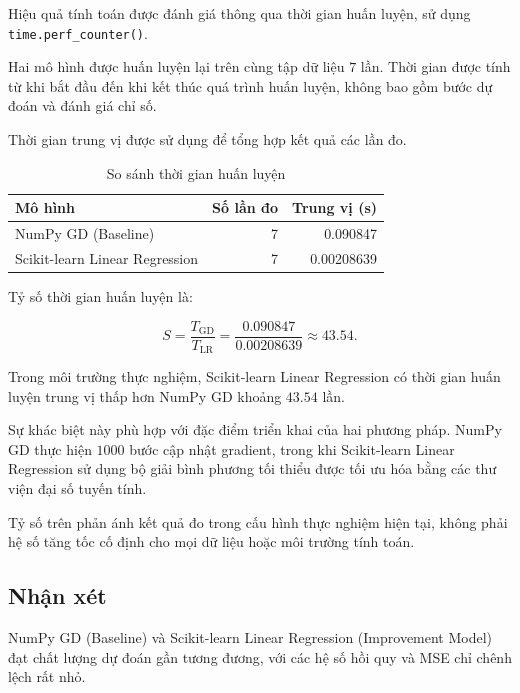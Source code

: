 Hiệu quả tính toán được đánh giá
thông qua thời gian huấn luyện,
sử dụng \texttt{time.perf\_counter()}.

Hai mô hình được huấn luyện lại
trên cùng tập dữ liệu $7$ lần.
Thời gian được tính từ khi bắt đầu
đến khi kết thúc quá trình huấn luyện,
không bao gồm bước dự đoán
và đánh giá chỉ số.

Thời gian trung vị được sử dụng
để tổng hợp kết quả các lần đo.

\begin{table}[H]
    \centering
    \caption{So sánh thời gian huấn luyện}
    \label{tab:library-training-time}
    \small

    \begin{tabular}{lrr}
        \toprule
        \textbf{Mô hình}
        & \textbf{Số lần đo}
        & \textbf{Trung vị (s)} \\
        \midrule

        NumPy GD (Baseline)
        & 7 & 0.090847 \\

        Scikit-learn Linear Regression
        & 7 & 0.00208639 \\

        \bottomrule
    \end{tabular}
\end{table}

Tỷ số thời gian huấn luyện là:

\[
    S=
    \frac{T_{\mathrm{GD}}}{T_{\mathrm{LR}}}
    =
    \frac{0.090847}{0.00208639}
    \approx43.54.
\]

Trong môi trường thực nghiệm,
Scikit-learn Linear Regression có
thời gian huấn luyện trung vị thấp hơn
NumPy GD khoảng $43.54$ lần.

Sự khác biệt này phù hợp với đặc điểm
triển khai của hai phương pháp.
NumPy GD thực hiện $1000$ bước
cập nhật gradient, trong khi
Scikit-learn Linear Regression sử dụng
bộ giải bình phương tối thiểu được
tối ưu hóa bằng các thư viện
đại số tuyến tính.

Tỷ số trên phản ánh kết quả đo
trong cấu hình thực nghiệm hiện tại,
không phải hệ số tăng tốc cố định
cho mọi dữ liệu hoặc môi trường tính toán.


\subsection{Nhận xét}

NumPy GD (Baseline) và Scikit-learn
Linear Regression (Improvement Model)
đạt chất lượng dự đoán gần tương đương,
với các hệ số hồi quy và MSE
chỉ chênh lệch rất nhỏ.

